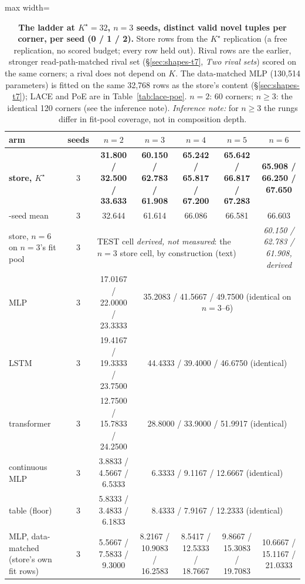 \documentclass{article} %
\newcommand{\Kstar}{\ensuremath{K^{\star}}}
\begin{document}
\begin{table}[t]
\centering\small
\caption{\textbf{The ladder at $\Kstar=32$, $n=3$ seeds, distinct valid novel tuples per %
corner, per seed (0 / 1 / 2).} Store rows from the $\Kstar$ replication (a free replication,
no scored budget; every row held out). Rival rows are the earlier, stronger read-path-matched rival
set (\S\ref{sec:shapes-t7}, \emph{Two rival sets}) scored on
the same corners; a rival does not depend on $K$. The data-matched MLP (130,514 parameters) is %
fitted on the same 32,768 rows as the store's content (\S\ref{sec:shapes-t7}); LACE and PoE are in %
Table~\ref{tab:lace-poe}. $n=2$: 60 corners; $n\ge3$: the identical %
120 corners (see the inference note). \emph{Inference note:} for $n\ge3$ the rungs differ in %
fit-pool coverage, not in composition depth.}
\label{tab:ladder}
\setlength{\tabcolsep}{2.6pt}
\begin{adjustbox}{max width=\linewidth}\begin{tabular}{lcccccc}
\toprule
arm & seeds & $n=2$ & $n=3$ & $n=4$ & $n=5$ & $n=6$ \\
\midrule
\textbf{store, $\Kstar$} & 3 & \textbf{31.800 / 32.500 / 33.633} & \textbf{60.150 / 62.783 / 61.908} & \textbf{65.242 / 65.817 / 67.200} & \textbf{65.642 / 66.817 / 67.283} & \textbf{65.908 / 66.250 / 67.650} \\
\quad 3-seed mean & 3 & 32.644 & 61.614 & 66.086 & 66.581 & 66.603 \\
store, $n=6$ on $n=3$'s fit pool & 3 & \multicolumn{4}{l}{TEST cell \emph{derived, not measured}: the $n=3$ store cell, by construction (text)} & \emph{60.150 / 62.783 / 61.908, derived} \\ %
MLP & 3 & 17.0167 / 22.0000 / 23.3333 & \multicolumn{4}{c}{35.2083 / 41.5667 / 49.7500 (identical on $n=3$--$6$)} \\
LSTM & 3 & 19.4167 / 19.3333 / 23.7500 & \multicolumn{4}{c}{44.4333 / 39.4000 / 46.6750 (identical)} \\
transformer & 3 & 12.7500 / 15.7833 / 24.2500 & \multicolumn{4}{c}{28.8000 / 33.9000 / 51.9917 (identical)} \\
continuous MLP & 3 & 3.8833 / 4.5667 / 6.5333 & \multicolumn{4}{c}{6.3333 / 9.1167 / 12.6667 (identical)} \\
table (floor) & 3 & 5.8333 / 3.4833 / 6.1833 & \multicolumn{4}{c}{8.4333 / 7.9167 / 12.2333 (identical)} \\
MLP, data-matched (store's own fit rows) & 3 & 5.5667 / 7.5833 / 9.3000 & 8.2167 / 10.9083 / 16.2583 & 8.5417 / 12.5333 / 18.7667 & 9.8667 / 15.3083 / 19.7083 & 10.6667 / 15.1167 / 21.0333 \\
\bottomrule
\end{tabular}\end{adjustbox}
\end{table}
\end{document}
